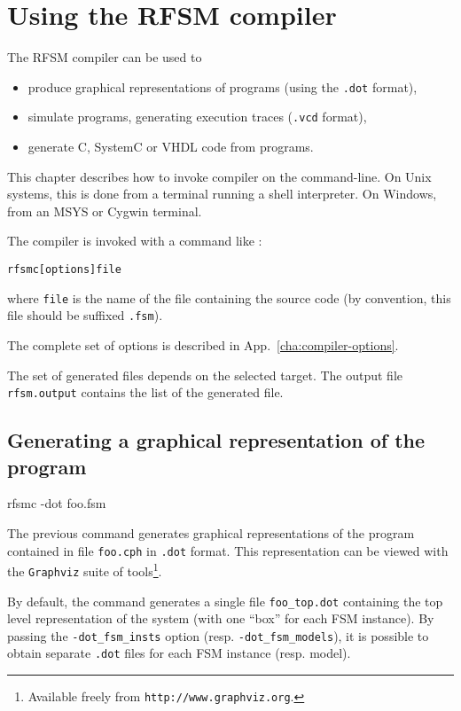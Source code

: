 \chapter{Using the RFSM compiler}
\label{cha:rfsmc}

The RFSM compiler can be used to
\begin{itemize}
\item produce graphical representations of programs (using the \verb|.dot| format),
\item simulate programs, generating execution traces (\verb|.vcd| format),
\item generate C, SystemC or VHDL code from programs.
\end{itemize}

This chapter describes how to invoke compiler on the command-line. On Unix systems, this is
done from a terminal running a shell interpreter. On Windows, from an MSYS or Cygwin
terminal.

\medskip
The compiler is invoked with a command like :

\begin{alltt}
rfsmc [options] file
\end{alltt}

where \texttt{file} is the name of the file containing the source code (by convention, this file
should be suffixed \texttt{.fsm}). 

The complete set of options is described in App.~\ref{cha:compiler-options}.

The set of generated files depends on the selected target. The output file \texttt{rfsm.output}
contains the list of the generated file.

\section{Generating a graphical representation of the program}
\label{sec:gener-graph-repr}

\begin{example}
rfsmc -dot foo.fsm  
\end{example}

The previous command generates graphical representations of the program contained in file
\texttt{foo.cph} in \verb|.dot| format.  This representation can be viewed with the
\texttt{Graphviz} suite of tools\footnote{Available freely from \texttt{http://www.graphviz.org}.}.

By default, the command generates a single file
\verb|foo_top.dot| containing the top level representation of the system (with one
  ``box'' for each FSM instance). By passing the \verb|-dot_fsm_insts| option
  (resp. \verb|-dot_fsm_models|), it is possible to obtain separate \verb|.dot| files for each FSM
  instance (resp. model).

